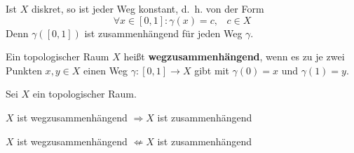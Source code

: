 \begin{beispiel}
    Ist $X$ diskret, so ist jeder Weg konstant, d.~h. von der Form
    \[\forall x \in [0,1]: \gamma(x) = c, \;\;\; c \in X\]
    Denn $\gamma([0,1])$ ist zusammenhängend für jeden Weg $\gamma$.
\end{beispiel}

\begin{definition}%
    Ein topologischer Raum $X$ heißt \textbf{wegzusammenhängend},
    wenn es zu je zwei Punkten $x,y \in X$ einen Weg $\gamma:[0,1] \rightarrow X$
    gibt mit $\gamma(0)=x$ und $\gamma(1)=y$.
\end{definition}

\begin{bemerkung}\label{kor:wegzusammehang-impliziert-zusammenhang}
    Sei $X$ ein topologischer Raum.

    \begin{bemenum}
        \item $X$ ist wegzusammenhängend $\Rightarrow X$ ist zusammenhängend
        \item $X$ ist wegzusammenhängend $\not\Leftarrow X$ ist zusammenhängend
    \end{bemenum}
\end{bemerkung}

